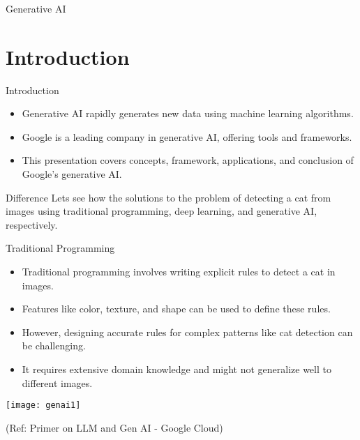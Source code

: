 \begin{frame}[fragile]\frametitle{}
\begin{center}
{\Large Generative AI}
\end{center}
\end{frame}

\section{Introduction}

\begin{frame}[fragile]{Introduction}
\begin{itemize}
\item Generative AI rapidly generates new data using machine learning algorithms.
\item Google is a leading company in generative AI, offering tools and frameworks.
\item This presentation covers concepts, framework, applications, and conclusion of Google's generative AI.
\end{itemize}
\end{frame}

\begin{frame}[fragile]{Difference}
Lets see how the solutions to the problem of detecting a cat from images using traditional programming, deep learning, and generative AI, respectively.
\end{frame}

\begin{frame}[fragile]{Traditional Programming}
  \begin{itemize}
    \item Traditional programming involves writing explicit rules to detect a cat in images.
    \item Features like color, texture, and shape can be used to define these rules.
    \item However, designing accurate rules for complex patterns like cat detection can be challenging.
    \item It requires extensive domain knowledge and might not generalize well to different images.
  \end{itemize}
  
\begin{center}
\texttt{[image: genai1]}
\end{center}

{\tiny (Ref: Primer on LLM and Gen AI - Google Cloud)}
  
\end{frame}

